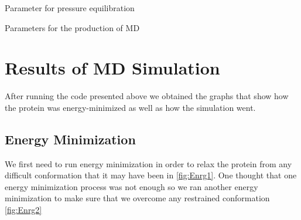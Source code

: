 \documentclass{article}
\begin{document}
 Parameter for pressure equilibration
 
 
 Parameters for the production of MD
 
 
 \section{Results of MD Simulation}
 After running the code presented above we obtained the graphs that show how the protein was energy-minimized as well as how the simulation went.
 \subsection{Energy Minimization}
 We first need to run energy minimization in order to relax the protein from any difficult conformation that it may have been in \cref{fig:Enrg1}. One thought that one energy minimization process was not enough so we ran another energy minimization to make sure that we overcome any restrained conformation \cref{fig:Enrg2}
\end{document}
